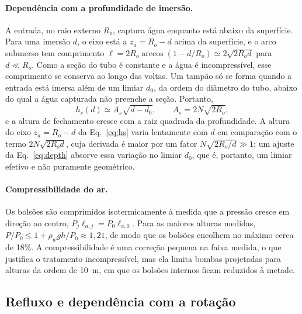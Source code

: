 \documentclass[aps,pre,twocolumn,superscriptaddress,nofootinbib,floatfix]{revtex4-2}
\begin{document}
\paragraph*{Dependência com a profundidade de imersão.} A entrada, no raio externo $R_o$, captura água enquanto está abaixo da superfície. Para uma imersão $d$, o eixo está a $z_a=R_o-d$ acima da superfície, e o arco submerso tem comprimento $\ell=2R_o\arccos(1-d/R_o)\simeq2\sqrt{2R_od}$ para $d\ll R_o$. Como a seção do tubo é constante e a água é incompressível, esse comprimento se conserva ao longo das voltas. Um tampão só se forma quando a entrada está imersa além de um limiar $d_0$, da ordem do diâmetro do tubo, abaixo do qual a água capturada não preenche a seção. Portanto,
\begin{equation}
  h_s(d) \simeq A_s\sqrt{d-d_0}, \qquad A_s = 2N\sqrt{2R_o},
  \label{eq:depth}
\end{equation}
e a altura de fechamento cresce com a raiz quadrada da profundidade. A altura do eixo $z_a=R_o-d$ da Eq.~\eqref{eq:hs} varia lentamente com $d$ em comparação com o termo $2N\sqrt{2R_od}$, cuja derivada é maior por um fator $N\sqrt{2R_o/d}\gg1$; um ajuste da Eq.~\eqref{eq:depth} absorve essa variação no limiar $d_0$, que é, portanto, um limiar efetivo e não puramente geométrico.

\paragraph*{Compressibilidade do ar.} Os bolsões são comprimidos isotermicamente à medida que a pressão cresce em direção ao centro, $P_j\ell_{a,j}=P_0\ell_{a,0}$. Para as maiores alturas medidas, $P/P_0\le1+\rho_wgh/P_0\approx1{,}21$, de modo que os bolsões encolhem no máximo cerca de 18\%. A compressibilidade é uma correção pequena na faixa medida, o que justifica o tratamento incompressível, mas ela limita bombas projetadas para alturas da ordem de \SI{10}{m}, em que os bolsões internos ficam reduzidos à metade.

\subsection{Refluxo e dependência com a rotação}
\label{sec:leak}
\end{document}
